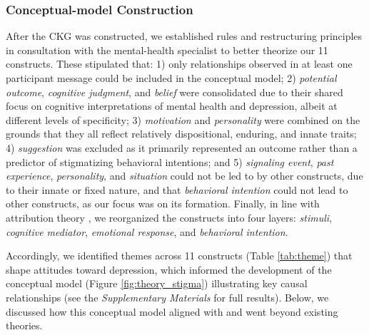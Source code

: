 \subsubsection{Conceptual-model Construction}
\label{results:conceptual}


After the CKG was constructed, we established rules and restructuring principles in consultation with the mental-health specialist to better theorize our 11 constructs.
These stipulated that: 1) only relationships observed in at least one participant message could be included in the conceptual model; 2) \textit{potential outcome}, \textit{cognitive judgment}, and \textit{belief} were consolidated due to their shared focus on cognitive interpretations of mental health and depression, albeit at different levels of specificity; 3) \textit{motivation} and \textit{personality} were combined on the grounds that they all reflect relatively dispositional, enduring, and innate traits; 4) \textit{suggestion} was excluded as it primarily represented an outcome rather than a predictor of stigmatizing behavioral intentions; and 5) \textit{signaling event}, \textit{past experience}, \textit{personality}, and \textit{situation} could not be led to by other constructs, due to their innate or fixed nature, and that \textit{behavioral intention} could not lead to other constructs, as our focus was on its formation. 
Finally, in line with attribution theory \cite{attribution_theory_corrigan_2000}, we reorganized the constructs into four layers: \textit{stimuli}, \textit{cognitive mediator}, \textit{emotional response}, and \textit{behavioral intention}.

Accordingly, we identified themes across 11 constructs (Table \ref{tab:theme}) that shape attitudes toward depression, which informed the development of the conceptual model (Figure \ref{fig:theory_stigma}) illustrating key causal relationships (see the \textit{Supplementary Materials} for full results).
Below, we discussed how this conceptual model aligned with and went beyond existing theories.



